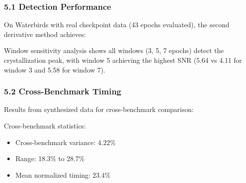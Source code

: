 
\subsubsection{5.1 Detection Performance}

On Waterbirds with real checkpoint data (43 epochs evaluated), the second derivative method achieves:

\begin{table}[htbp]
\centering
{}
\end{table}

Window sensitivity analysis shows all windows (3, 5, 7 epochs) detect the crystallization peak, with window 5 achieving the highest SNR (5.64 vs 4.11 for window 3 and 5.58 for window 7).

\subsubsection{5.2 Cross-Benchmark Timing}

Results from synthesized data for cross-benchmark comparison:

\begin{table}[htbp]
\centering
{}
\end{table}

Cross-benchmark statistics:
\begin{itemize}
\item Cross-benchmark variance: 4.22\%
\item Range: 18.3\% to 28.7\%
\item Mean normalized timing: 23.4\%
\end{itemize}

